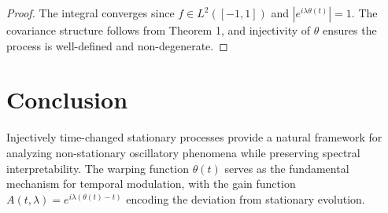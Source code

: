 \documentclass[11pt]{article}
\begin{document}
\begin{proof}
The integral converges since $f \in L^2([-1,1])$ and $|e^{i\lambda\theta(t)}| = 1$. The covariance structure follows from Theorem 1, and injectivity of $\theta$ ensures the process is well-defined and non-degenerate.
\end{proof}

\section{Conclusion}

Injectively time-changed stationary processes provide a natural framework for analyzing non-stationary oscillatory phenomena while preserving spectral interpretability. The warping function $\theta(t)$ serves as the fundamental mechanism for temporal modulation, with the gain function $A(t,\lambda) = e^{i\lambda(\theta(t)-t)}$ encoding the deviation from stationary evolution.
\end{document}
